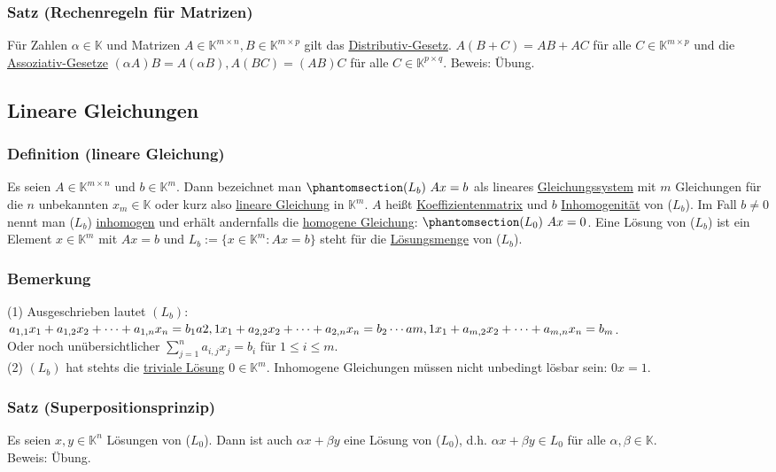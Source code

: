 \subsubsection{Satz (Rechenregeln für Matrizen)}
Für Zahlen $\alpha \in \mathbb{K}$ und Matrizen $A\in \mathbb{K}^{m\times n},B\in\mathbb{K}^{m\times p}$ gilt das \underline{Distributiv-Gesetz}.  $A(B+C)=AB+AC$ für alle $C\in \mathbb{K}^{m\times p}$ und die \underline{Assoziativ-Gesetze} $(\alpha A)B=A(\alpha B), A(BC)=(AB)C$ für alle $C\in \mathbb{K}^{p\times q}$.
Beweis: Übung.
\subsection{Lineare Gleichungen}
\subsubsection{Definition (lineare Gleichung)}
Es seien $A\in \mathbb{K}^{m\times n}$ und $b\in \mathbb{K}^{m}$.  Dann bezeichnet man $\phantomsection\label{Lb}(L_b)\ Ax=b$ als lineares \underline{Gleichungssystem} mit $m$ Gleichungen für die $n$ unbekannten $x_m\in \mathbb{K}$ oder kurz also \underline{lineare Gleichung} in $\mathbb{K}^m$.  $A$ heißt \underline{Koeffizientenmatrix} und $b$ \underline{Inhomogenität} von (\hyperref[Lb]{$L_b$}).  Im Fall $b\not= 0$ nennt man (\hyperref[Lb]{$L_b$}) \underline{inhomogen} und erhält andernfalls die \underline{homogene Gleichung}: $\phantomsection\label{L0}(L_0)\ Ax=0$.  Eine Lösung von (\hyperref[Lb]{$L_b$}) ist ein Element $x\in \mathbb{K}^m$ mit $Ax=b$ und $L_b:=\{ x\in \mathbb{K}^m:Ax=b\}$ steht für die \underline{Lösungsmenge} von (\hyperref[Lb]{$L_b$}).
\subsubsection{Bemerkung}
(1) Ausgeschrieben lautet $(L_b)$:\\$a_{1,1}x_1+a_{1,2}x_2+\cdots +a_{1,n}x_n = b_1\\a{2,1}x_1+a_{2,2}x_2+\cdots +a_{2,n}x_n = b_2\\\cdots \\a{m,1}x_1+a_{m,2}x_2+\cdots +a_{m,n}x_n=b_m$.\\Oder noch unübersichtlicher $\sum^n_{j=1} a_{i,j}x_j = b_i$ für $1\leq i\leq m$.\\
(2) $(L_b)$ hat stehts die \underline{triviale Lösung} $0\in \mathbb{K}^m$.  Inhomogene Gleichungen müssen nicht unbedingt lösbar sein: $0x=1$.\\
\subsubsection{Satz (Superpositionsprinzip)}
\label{superposition}
Es seien $x,y \in \mathbb{K}^n$ Lösungen von (\hyperref[L0]{$L_0$}).  Dann ist auch $\alpha x+\beta y$ eine Lösung von (\hyperref[L0]{$L_0$}), d.h. $\alpha x+\beta y\in L_0$ für alle $\alpha ,\beta \in \mathbb{K}$. \\
Beweis: Übung.
